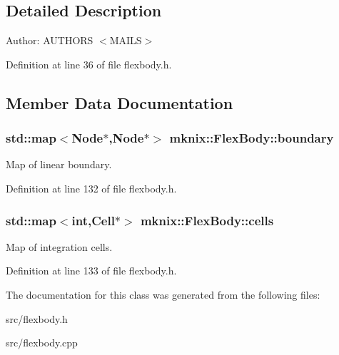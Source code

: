 \subsection{Detailed Description}
\begin{Desc}
\item[Author:]AUTHORS $<$MAILS$>$ \end{Desc}


Definition at line 36 of file flexbody.h.

\subsection{Member Data Documentation}
\hypertarget{classmknix_1_1FlexBody_ceffa0715f6180a5945fe4cccb6723a9}{
\subsubsection{\setlength{\rightskip}{0pt plus 5cm}std::map$<${\bf Node}$\ast$,{\bf Node}$\ast$$>$ {\bf mknix::FlexBody::boundary}}}
\label{classmknix_1_1FlexBody_ceffa0715f6180a5945fe4cccb6723a9}


Map of linear boundary. 

Definition at line 132 of file flexbody.h.\hypertarget{classmknix_1_1FlexBody_9ad2c335bec4ab136091934de6379a67}{
\subsubsection{\setlength{\rightskip}{0pt plus 5cm}std::map$<$int,{\bf Cell}$\ast$$>$ {\bf mknix::FlexBody::cells}}}
\label{classmknix_1_1FlexBody_9ad2c335bec4ab136091934de6379a67}


Map of integration cells. 

Definition at line 133 of file flexbody.h.

The documentation for this class was generated from the following files:\begin{CompactItemize}
\item 
src/flexbody.h\item 
src/flexbody.cpp\end{CompactItemize}
